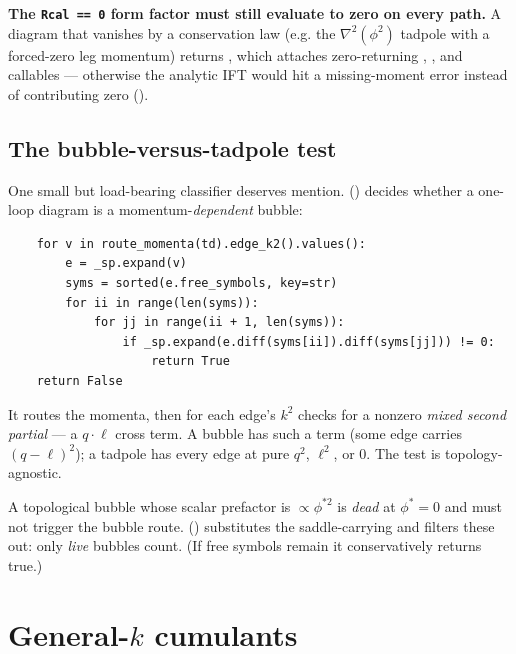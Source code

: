 \begin{gotcha}
\textbf{The \texttt{Rcal == 0} form factor must still evaluate to zero on every
path.} A diagram that vanishes by a conservation law (e.g. the
$\nabla^{2}(\phi^{2})$ tadpole with a forced-zero leg momentum) returns
, which attaches zero-returning ,
, and  callables --- otherwise the
analytic IFT would hit a missing-moment error instead of contributing zero
().
\end{gotcha}

\subsection{The bubble-versus-tadpole test}

One small but load-bearing classifier deserves mention.
 () decides whether
a one-loop diagram is a momentum-\emph{dependent} bubble:

\begin{lstlisting}
    for v in route_momenta(td).edge_k2().values():
        e = _sp.expand(v)
        syms = sorted(e.free_symbols, key=str)
        for ii in range(len(syms)):
            for jj in range(ii + 1, len(syms)):
                if _sp.expand(e.diff(syms[ii]).diff(syms[jj])) != 0:
                    return True
    return False
\end{lstlisting}

It routes the momenta, then for each edge's $k^{2}$ checks for a nonzero
\emph{mixed second partial} --- a $q\cdot\ell$ cross term. A bubble has such a
term (some edge carries $(q-\ell)^{2}$); a tadpole has every edge at pure
$q^{2}$, $\ell^{2}$, or $0$. The test is topology-agnostic.

\begin{gotcha}
A topological bubble whose scalar prefactor is $\propto\phi^{*2}$ is \emph{dead}
at $\phi^{*}=0$ and must not trigger the bubble route.
 () substitutes the
saddle-carrying  and filters these out: only \emph{live}
bubbles count. (If free symbols remain it conservatively returns true.)
\end{gotcha}

\section{General-\texorpdfstring{$k$}{k} cumulants}\label{sec:kpoint}

